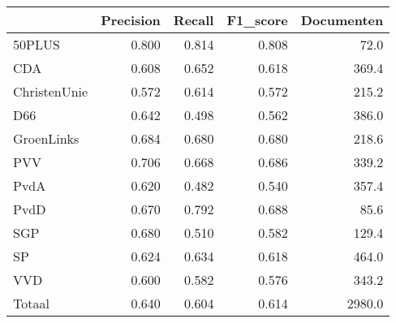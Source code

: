 \begin{tabular}{lrrrr}
\toprule
{} &  Precision &  Recall &  F1\_score &  Documenten \\
\midrule
50PLUS       &      0.800 &   0.814 &     0.808 &        72.0 \\
   CDA       &      0.608 &   0.652 &     0.618 &       369.4 \\
ChristenUnie &      0.572 &   0.614 &     0.572 &       215.2 \\
   D66       &      0.642 &   0.498 &     0.562 &       386.0 \\
  GroenLinks &      0.684 &   0.680 &     0.680 &       218.6 \\
   PVV       &      0.706 &   0.668 &     0.686 &       339.2 \\
  PvdA       &      0.620 &   0.482 &     0.540 &       357.4 \\
  PvdD       &      0.670 &   0.792 &     0.688 &        85.6 \\
   SGP       &      0.680 &   0.510 &     0.582 &       129.4 \\
    SP       &      0.624 &   0.634 &     0.618 &       464.0 \\
   VVD       &      0.600 &   0.582 &     0.576 &       343.2 \\
Totaal       &      0.640 &   0.604 &     0.614 &      2980.0 \\
\bottomrule
\end{tabular}
